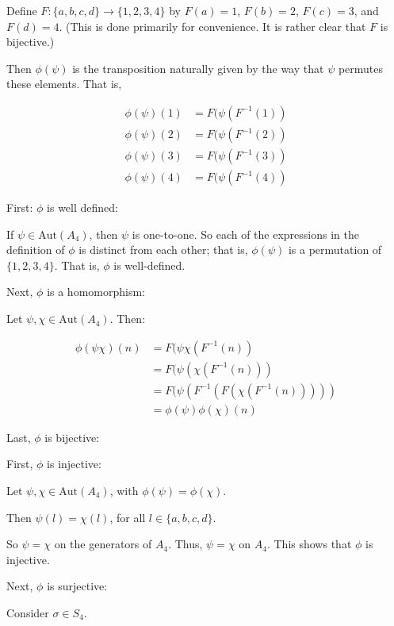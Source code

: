\documentclass[a4paper,12pt]{article}
\newcommand{\tab}{\hspace{4mm}} %
\newcommand{\shunt}{\vspace{20mm}}
\newcommand{\si}{\sigma}
\begin{document}
\tab Define $F: \{a,b,c,d\} \to \{1,2,3,4\}$ by $F(a) =1$, $F(b) = 2$, $F(c) = 3$, and $F(d) = 4$. (This is done primarily for convenience. It is rather clear that $F$ is bijective.)

\tab Then $\phi(\psi)$ is the transposition naturally given by the way that $\psi$ permutes these elements. That is,

\begin{align*}
\phi(\psi)(1) &= F(\psi(F^{-1}(1)) \\
\phi(\psi)(2) &= F(\psi(F^{-1}(2)) \\
\phi(\psi)(3) &= F(\psi(F^{-1}(3)) \\
\phi(\psi)(4) &= F(\psi(F^{-1}(4)) 
\end{align*}

\tab First: $\phi$ is well defined:

\tab \tab If $\psi \in \text{Aut}(A_4)$, then $\psi$ is one-to-one. So each of the expressions in the definition of $\phi$ is distinct from each other; that is, $\phi(\psi)$ is a permutation of $\{1,2,3,4\}$. That is, $\phi$ is well-defined.

\tab Next, $\phi$ is a homomorphism:

\tab \tab Let $\psi, \chi \in \text{Aut}(A_4)$. Then:

\begin{align*}
\phi(\psi\chi)(n) &= F(\psi\chi(F^{-1}(n))\\
&= F(\psi(\chi(F^{-1}(n)))\\
&= F(\psi(F^{-1}(F(\chi(F^{-1}(n)))))\\
&= \phi(\psi)\phi(\chi)(n)
\end{align*}

\tab Last, $\phi$ is bijective:

\tab \tab First, $\phi$ is injective:

\tab \tab \tab Let $\psi, \chi \in \text{Aut}(A_4)$, with $\phi(\psi) = \phi(\chi)$.

\tab \tab \tab Then $\psi(l) = \chi(l)$, for all $l \in \{a,b,c,d\}$.

\tab \tab \tab So $\psi = \chi$ on the generators of $A_4$. Thus, $\psi=\chi$ on $A_4$. This shows that $\phi$ is injective.

\tab \tab Next, $\phi$ is surjective:

\tab \tab \tab Consider $\si \in S_4$. 

\shunt
\end{document}
